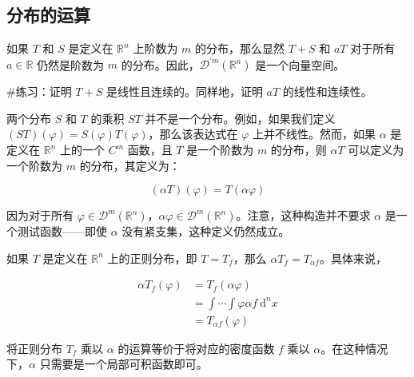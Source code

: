 \subsection{分布的运算}\label{ux5206ux5e03ux7684ux8fd0ux7b97}

如果 \(T\) 和 \(S\) 是定义在 \(\mathbb{R}^{n}\) 上阶数为 \(m\)
的分布，那么显然 \(T + S\) 和 \(aT\) 对于所有 \(a \in \mathbb{R}\)
仍然是阶数为 \(m\)
的分布。因此，\(\mathcal{D}^{\prime m}\left( \mathbb{R}^{n} \right)\)
是一个向量空间。

\#练习：证明 \(T + S\) 是线性且连续的。同样地，证明 \(aT\)
的线性和连续性。

两个分布 \(S\) 和 \(T\) 的乘积 \(ST\) 并不是一个分布。例如，如果我们定义
\((ST)(\varphi) = S(\varphi)T(\varphi)\)，那么该表达式在 \(\varphi\)
上并不线性。然而，如果 \(\alpha\) 是定义在 \(\mathbb{R}^{n}\) 上的一个
\(C^{m}\) 函数，且 \(T\) 是一个阶数为 \(m\) 的分布，则 \(\alpha T\)
可以定义为一个阶数为 \(m\) 的分布，其定义为：

\[(\alpha T)(\varphi) = T(\alpha\varphi)\]

因为对于所有
\(\varphi \in \mathcal{D}^{m}\left( \mathbb{R}^{n} \right)\)，\(\alpha\varphi \in \mathcal{D}^{m}\left( \mathbb{R}^{n} \right)\)。注意，这种构造并不要求
\(\alpha\) 是一个测试函数------即使 \(\alpha\)
没有紧支集，这种定义仍然成立。

如果 \(T\) 是定义在 \(\mathbb{R}^{n}\) 上的正则分布，即
\(T = T_{f}\)，那么 \(\alpha T_{f} = T_{\alpha f}\)。具体来说，

\[\begin{aligned}
\alpha T_{f}(\varphi) & = T_{f}(\alpha\varphi) \\
 & = \int\cdots\int\varphi\alpha f\mathrm{\: d}^{n}x \\
 & = T_{\alpha f}(\varphi)
\end{aligned}\]

将正则分布 \(T_{f}\) 乘以 \(\alpha\) 的运算等价于将对应的密度函数 \(f\)
乘以 \(\alpha\)。在这种情况下，\(\alpha\) 只需要是一个局部可积函数即可。

